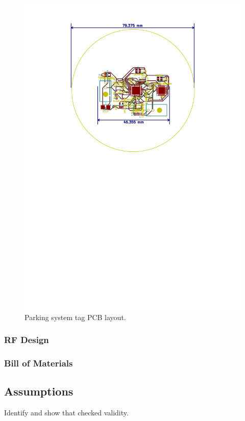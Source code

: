 \begin{figure}[H]
\begin{center}
\includegraphics[trim={4cm 15cm 4cm 1cm},clip]{data/pcb-layout.pdf}
\caption{Parking system tag PCB layout.}
\end{center}
\end{figure}

\subsubsection{RF Design}


\subsubsection{Bill of Materials}

\subsection{Assumptions}
Identify and show that checked validity.
